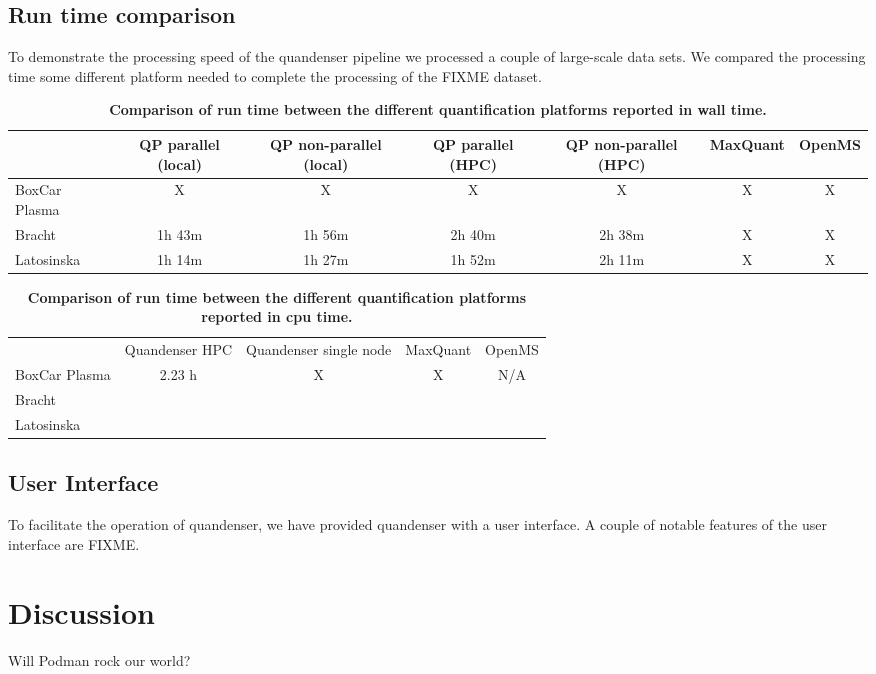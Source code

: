 \documentclass[11pt]{article}
\begin{document}
\subsection*{Run time comparison}

To demonstrate the processing speed of the quandenser pipeline we processed a couple of large-scale data sets. We compared the processing time some different platform needed to complete the processing of the FIXME dataset.
\begin{table}[!h]
  \begin{center}
  \caption{\textbf{Comparison of run time between the different quantification platforms reported in wall time.}}
  \label{table:walltime}
\begin{tabular}{lcccccc}
& QP parallel (local) & QP non-parallel (local) & QP parallel (HPC) & QP non-parallel (HPC) & MaxQuant & OpenMS \\ \hline \hline
BoxCar Plasma & X & X & X & X & X & X \\
Bracht & 1h 43m & 1h 56m & 2h 40m & 2h 38m & X & X \\
Latosinska & 1h 14m & 1h 27m & 1h 52m & 2h 11m & X & X \\
\end{tabular}
\end{center}
\end{table}

\begin{table}
  \caption{\textbf{Comparison of run time between the different quantification platforms reported in cpu time.}}
  \label{table:cputime}
\begin{tabular}{lcccc}
& Quandenser HPC & Quandenser single node & MaxQuant & OpenMS \\
BoxCar Plasma & 2.23 h & X & X & N/A \\
Bracht &  & &&  \\
Latosinska & &&& \\
\end{tabular}

\end{table}


\subsection*{User Interface}

To facilitate the operation of quandenser, we have provided quandenser with a user interface. A couple of notable features of the user interface are FIXME.

\section*{Discussion}

Will Podman rock our world?




\end{document}
